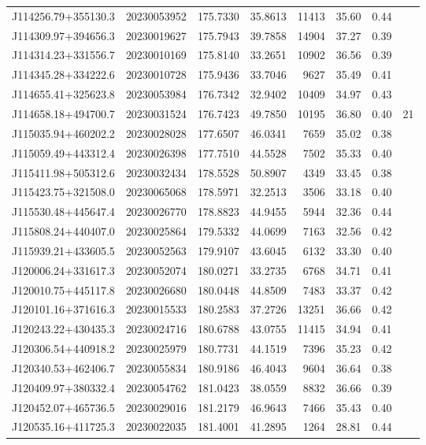 \documentclass{article}
\begin{document}
\begin {longtable}{|l|l|r|r|r|r|r|l|}
 J114256.79+355130.3&  20230053952&  175.7330&   35.8613& 11413& 35.60& 0.44&\\
 J114309.97+394656.3&  20230019627&  175.7943&   39.7858& 14904& 37.27& 0.39&\\
 J114314.23+331556.7&  20230010169&  175.8140&   33.2651& 10902& 36.56& 0.39&\\
 J114345.28+334222.6&  20230010728&  175.9436&   33.7046&  9627& 35.49& 0.41&\\
 J114655.41+325623.8&  20230053984&  176.7342&   32.9402& 10409& 34.97& 0.43&\\
 J114658.18+494700.7&  20230031524&  176.7423&   49.7850& 10195& 36.80& 0.40&21\\
 J115035.94+460202.2&  20230028028&  177.6507&   46.0341&  7659& 35.02& 0.38&\\
 J115059.49+443312.4&  20230026398&  177.7510&   44.5528&  7502& 35.33& 0.40&\\
 J115411.98+505312.6&  20230032434&  178.5528&   50.8907&  4349& 33.45& 0.38&\\
 J115423.75+321508.0&  20230065068&  178.5971&   32.2513&  3506& 33.18& 0.40&\\
 J115530.48+445647.4&  20230026770&  178.8823&   44.9455&  5944& 32.36& 0.44&\\
 J115808.24+440407.0&  20230025864&  179.5332&   44.0699&  7163& 32.56& 0.42&\\
 J115939.21+433605.5&  20230052563&  179.9107&   43.6045&  6132& 33.30& 0.40&\\
 J120006.24+331617.3&  20230052074&  180.0271&   33.2735&  6768& 34.71& 0.41&\\
 J120010.75+445117.8&  20230026680&  180.0448&   44.8509&  7483& 33.37& 0.42&\\
 J120101.16+371616.3&  20230015533&  180.2583&   37.2726& 13251& 36.66& 0.42&\\
 J120243.22+430435.3&  20230024716&  180.6788&   43.0755& 11415& 34.94& 0.41&\\
 J120306.54+440918.2&  20230025979&  180.7731&   44.1519&  7396& 35.23& 0.42&\\
 J120340.53+462406.7&  20230055834&  180.9186&   46.4043&  9604& 36.64& 0.38&\\
 J120409.97+380332.4&  20230054762&  181.0423&   38.0559&  8832& 36.66& 0.39&\\
 J120452.07+465736.5&  20230029016&  181.2179&   46.9643&  7466& 35.43& 0.40&\\
 J120535.16+411725.3&  20230022035&  181.4001&   41.2895&  1264& 28.81& 0.44&\\

\end{longtable}
\end{document}
